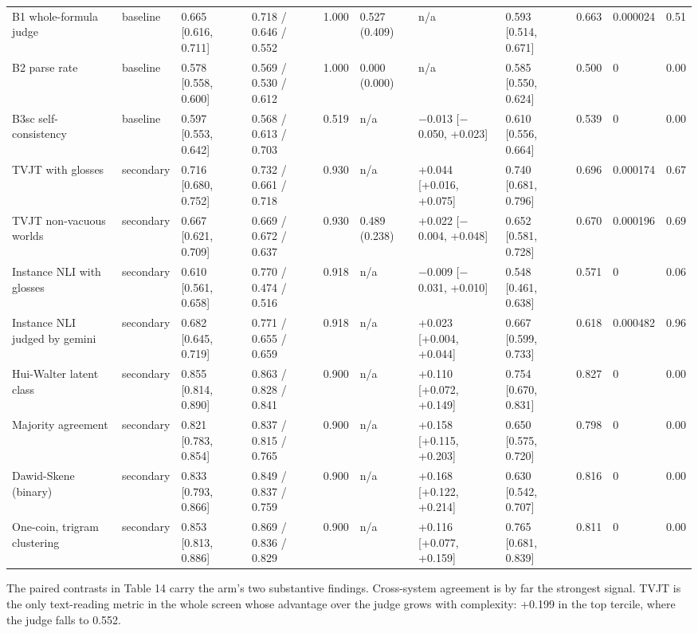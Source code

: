\documentclass[11pt,letterpaper]{article}
\begin{document}
\begin{landscape}
{\begin{longtable}
{}B1 whole-formula judge & baseline & 0.665 [0.616, 0.711] & 0.718 / 0.646 / 0.552 & 1.000 & 0.527 (0.409) & n/a & 0.593 [0.514, 0.671] & 0.663 & 0.000024 & 0.51 \\
{}B2 parse rate & baseline & 0.578 [0.558, 0.600] & 0.569 / 0.530 / 0.612 & 1.000 & 0.000 (0.000) & n/a & 0.585 [0.550, 0.624] & 0.500 & 0 & 0.00 \\
{}B3sc self-consistency & baseline & 0.597 [0.553, 0.642] & 0.568 / 0.613 / 0.703 & 0.519 & n/a & $-$0.013 [$-$0.050, +0.023] & 0.610 [0.556, 0.664] & 0.539 & 0 & 0.00 \\
{}TVJT with glosses & secondary & 0.716 [0.680, 0.752] & 0.732 / 0.661 / 0.718 & 0.930 & n/a & +0.044 [+0.016, +0.075] & 0.740 [0.681, 0.796] & 0.696 & 0.000174 & 0.67 \\
{}TVJT non-vacuous worlds & secondary & 0.667 [0.621, 0.709] & 0.669 / 0.672 / 0.637 & 0.930 & 0.489 (0.238) & +0.022 [$-$0.004, +0.048] & 0.652 [0.581, 0.728] & 0.670 & 0.000196 & 0.69 \\
{}Instance NLI with glosses & secondary & 0.610 [0.561, 0.658] & 0.770 / 0.474 / 0.516 & 0.918 & n/a & $-$0.009 [$-$0.031, +0.010] & 0.548 [0.461, 0.638] & 0.571 & 0 & 0.06 \\
{}Instance NLI judged by gemini & secondary & 0.682 [0.645, 0.719] & 0.771 / 0.655 / 0.659 & 0.918 & n/a & +0.023 [+0.004, +0.044] & 0.667 [0.599, 0.733] & 0.618 & 0.000482 & 0.96 \\
{}Hui-Walter latent class & secondary & 0.855 [0.814, 0.890] & 0.863 / 0.828 / 0.841 & 0.900 & n/a & +0.110 [+0.072, +0.149] & 0.754 [0.670, 0.831] & 0.827 & 0 & 0.00 \\
{}Majority agreement & secondary & 0.821 [0.783, 0.854] & 0.837 / 0.815 / 0.765 & 0.900 & n/a & +0.158 [+0.115, +0.203] & 0.650 [0.575, 0.720] & 0.798 & 0 & 0.00 \\
{}Dawid-Skene (binary) & secondary & 0.833 [0.793, 0.866] & 0.849 / 0.837 / 0.759 & 0.900 & n/a & +0.168 [+0.122, +0.214] & 0.630 [0.542, 0.707] & 0.816 & 0 & 0.00 \\
{}One-coin, trigram clustering & secondary & 0.853 [0.813, 0.886] & 0.869 / 0.836 / 0.829 & 0.900 & n/a & +0.116 [+0.077, +0.159] & 0.765 [0.681, 0.839] & 0.811 & 0 & 0.00 \\
\end{longtable}
}
\end{landscape}

The paired contrasts in Table 14 carry the arm's two substantive findings. Cross-system agreement is by far the strongest signal. TVJT is the only text-reading metric in the whole screen whose advantage over the judge grows with complexity: +0.199 in the top tercile, where the judge falls to 0.552.
\end{document}
